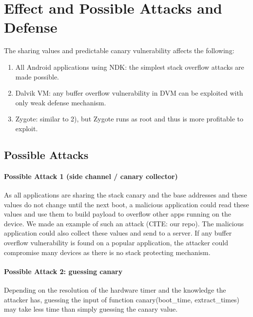 \section{Effect and Possible Attacks and Defense}

The sharing values and predictable canary vulnerability affects the following:
\begin{enumerate}

\item All Android applications using NDK: the simplest stack overflow attacks are made possible.

\item Dalvik VM: any buffer overflow vulnerability in DVM can be exploited with only weak defense mechanism.

\item Zygote: similar to 2), but Zygote runs as root and thus is more profitable to exploit.

\end{enumerate}

\subsection{Possible Attacks}

\paragraph*{Possible Attack 1 (side channel / canary collector)} 

As all applications are sharing the stack canary and the base addresses and these values do not change until the next boot, a malicious application could read these values and use them to build payload to overflow other apps running on the device. We made an example of such an attack (CITE: our repo). The malicious application could also collect these values and send to a server. If any buffer overflow vulnerability is found on a popular application, the attacker could compromise many devices as there is no stack protecting mechanism.

\paragraph*{Possible Attack 2: guessing canary} 

Depending on the resolution of the hardware timer and the knowledge the attacker has,  guessing the input of function canary(boot\_time, extract\_times) may take less time than simply guessing the canary value.

